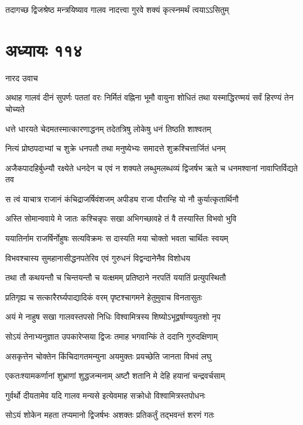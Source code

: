 \twolineshloka
{तदागच्छ द्विजश्रेष्ठ मन्त्रयिष्याव गालव}
{नादत्त्वा गुरवे शक्यं कृत्स्नमर्थं त्वयाऽऽसितुम्}


\chapter{अध्यायः ११४}
\twolineshloka
{नारद उवाच}
{}


\threelineshloka
{अथाह गालवं दीनं सुपर्णः पततां वरः}
{निर्मितं वह्निना भूमौ वायुना शोधितं तथा}
{यस्माद्धिरण्मयं सर्वं हिरण्यं तेन चोच्यते}


\twolineshloka
{धत्ते धारयते चेदमतस्मात्कारणाद्धनम्}
{तदेतत्रिषु लोकेषु धनं तिष्ठति शाश्वतम्}


\twolineshloka
{नित्यं प्रोष्ठपदाभ्यां च शुक्रे धनपतौ तथा}
{मनुष्येभ्यः समादत्ते शुक्रश्चित्तार्जितं धनम्}


\threelineshloka
{अजैकपादहिर्बुध्न्यौ रक्ष्येते धनदेन च}
{एवं न शक्यते लब्धुमलब्धव्यं द्विजर्षभ}
{ऋते च धनमश्वानां नावाप्तिर्विद्यते तव}


\twolineshloka
{स त्वं याचात्र राजानं कंचिद्राजर्षिवंशजम्}
{अपीड्य राजा पौरान्हि यो नौ कुर्यात्कृतार्थिनौ}


\twolineshloka
{अस्ति सोमान्ववाये मे जातः कश्चिन्नृपः सखा}
{अभिगच्छावहे तं वै तस्यास्ति विभवो भुवि}


\twolineshloka
{ययातिर्नाम राजर्षिर्नोहुषः सत्यविक्रमः}
{स दास्यति मया चोक्तो भवता चार्थितः स्वयम्}


\twolineshloka
{विभवश्चास्य सुमहानासीद्धनपतेरिव}
{एवं गुरुधनं विद्वन्दानेनैव विशोधय}


\twolineshloka
{तथा तौ कथयन्तौ च चिन्तयन्तौ च यत्क्षमम्}
{प्रतिष्ठाने नरपतिं ययातिं प्रत्युपस्थितौ}


\twolineshloka
{प्रतिगृह्य च सत्कारैरर्घ्यपाद्यादिकं वरम्}
{पृष्टश्चागमने हेतुमुवाच विनतासुतः}


\twolineshloka
{अयं मे नाहुष सखा गालवस्तपसो निधिः}
{विश्वामित्रस्य शिष्योऽभूद्वर्षाण्ययुतशो नृप}


\twolineshloka
{सोऽयं तेनाभ्यनुज्ञात उपकारेप्सया द्विजः}
{तमाह भगवान्किं ते ददानि गुरुदक्षिणाम्}


\twolineshloka
{असकृत्तेन चोक्तेन किंचिदागतमन्युना}
{अयमुक्तः प्रयच्छेति जानता विभवं लघु}


\twolineshloka
{एकतःश्यामकर्णानां शुभ्राणां शुद्धजन्मनाम्}
{अष्टौ शतानि मे देहि हयानां चन्द्रवर्चसाम्}


\twolineshloka
{गुर्वर्थो दीयतामेव यदि गालव मन्यसे}
{इत्येवमाह सक्रोधो विश्वामित्रस्तपोधनः}


\twolineshloka
{सोऽयं शोकेन महता तप्यमानो द्विजर्षभः}
{अशक्तः प्रतिकर्तुं तद्भवन्तं शरणं गतः}


